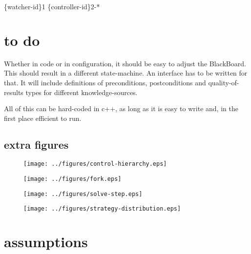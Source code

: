 \documentclass[]{lofar}
\begin{document}
        \{watcher-id\}1 \{controller-id\}2-*

  \section{to do}
  \label{sec:todo}\hypertarget{sec:todo}{}

    Whether in code or in configuration, it should be easy to adjust
    the BlackBoard. This should result in a different
    state-machine. An interface has to be written for that. It will
    include definitions of preconditions, postconditions and
    quality-of-results types for different knowledge-sources.

    All of this can be hard-coded in c++, as long as it is easy to
    write and, in the first place efficient to run.

    \subsection{extra figures}
    \begin{figure}
      \texttt{[image: ../figures/control-hierarchy.eps]}
    \end{figure}

    \begin{figure}
      \texttt{[image: ../figures/fork.eps]}
    \end{figure}

    \begin{figure}
      \texttt{[image: ../figures/solve-step.eps]}
    \end{figure}

    \begin{figure}
      \texttt{[image: ../figures/strategy-distribution.eps]}
    \end{figure}

\newcommand{\dbappendix}[1]{\section{#1}}%

\appendix

  \dbappendix{assumptions}
  \label{app:assumptions}\hypertarget{app:assumptions}{}

\end{document}
